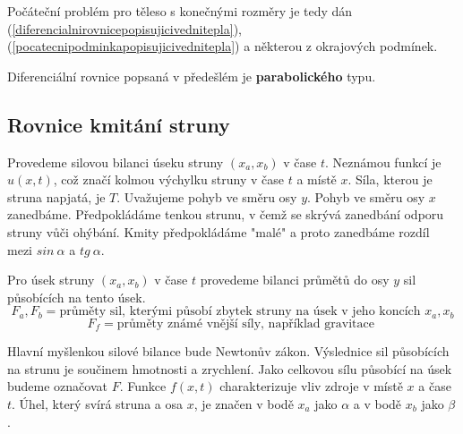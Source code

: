 \documentclass[a4]{report}
\theoremstyle{definition}
\begin{document}
Počáteční problém pro těleso s konečnými rozměry je tedy dán (\ref{diferencialnirovnicepopisujicivednitepla}), (\ref{pocatecnipodminkapopisujicivednitepla}) a některou z okrajových podmínek.

Diferenciální rovnice popsaná v předešlém je \textbf{parabolického} typu.

\subsection{Rovnice kmitání struny}
 Provedeme silovou bilanci úseku struny $(x_a,x_b)$ v čase $t$. Neznámou funkcí je $u(x,t)$, což značí kolmou výchylku struny v čase $t$ a místě $x$. Síla, kterou je struna napjatá, je $T$. Uvažujeme pohyb ve směru osy $y$. Pohyb ve směru osy $x$ zanedbáme. Předpokládáme tenkou strunu, v čemž se skrývá zanedbání odporu struny vůči ohýbání. Kmity předpokládáme "malé" a proto zanedbáme rozdíl mezi $sin \ \alpha$ a $tg \ \alpha$.
 
 Pro úsek struny $(x_a,x_b)$ v čase $t$ provedeme bilanci průmětů do osy $y$ sil působících na tento úsek.
 $$F_a, F_b=\textrm{průměty sil, kterými působí zbytek struny na úsek v jeho koncích }x_a,x_b $$
 $$F_f=\textrm{průměty známé vnější síly, například gravitace }$$
 
 Hlavní myšlenkou silové bilance bude Newtonův zákon. Výslednice sil působících na strunu je součinem hmotnosti a zrychlení. Jako celkovou sílu působící na úsek budeme označovat $F$. Funkce $f(x,t)$ charakterizuje vliv zdroje v místě $x$ a čase $t$. Úhel, který svírá struna a osa $x$, je značen v bodě $x_a$ jako $\alpha$ a v bodě $x_b$ jako $\beta$.
\end{document}
